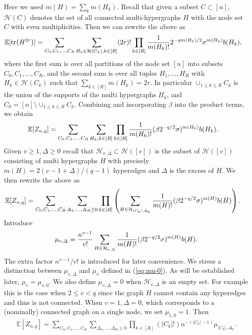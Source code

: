\documentclass[12pt]{article}
\newcommand{\E}{\mathbb{E}}
\newcommand{\cH}{\mathcal{H}}
\begin{document}
Here we used $m(H)=\sum_k m(H_k)$.
Recall that  given a subset $C\subset [n]$,  $\cH(C)$ denotes  the set of all connected multi-hypergraphs $H$ with the node set $C$
with even multiplicities. Then we can rewrite the above as
\begin{align*}
\E[\tr(H^{2r})]&=\sum_{C_0,C_1,\ldots,C_R} \sum_{H_k\in\cH(C_k),k\in [R]}(2r)!\prod_{k\in [R]}{1\over  m(H_k)!}2^{-q m(H_k)/2}\sigma^{m(H_k)} b(H_k),
\end{align*}
where the first sum is over all partitions of the node set $[n]$ into subsets $C_0,C_1,\ldots,C_R$, and the second sum is over all 
tuples $H_1,\ldots,H_R$ with $H_k\in\cH(C_k)$ such that $\sum_{k\in [R]} m(H_k) =2r$.  In particular $\cup_{1\le k\le R}C_k$
is the union of the supports of the multi hypergraphs $H_k$, and $C_0=[n]\setminus \cup_{1\le k\le R} C_k$.
Combining and incorporating $\beta$ into the product terms, 
we obtain
\begin{align*}
\E[Z_{n,q}]  &= 
 \sum_{C_0,C_1,\ldots,C_R} \sum_{H_k,k\in [R]}\prod_{k\in [R]}{1\over  m(H_k)!}(\beta2^{-q/2}\sigma)^{m(H_k)}b(H_k).
 \end{align*}
Given  $v\ge 1,\Delta\ge 0$ recall that $\cH_{v,\Delta}\subset \cH([v])$ is the subset of $\cH([v])$ consisting of multi hypergraphs $H$ with precisely 
$m(H)=2(v-1+\Delta)/(q-1)$ hyperedges and $\Delta$ is the excess of $H$.
We then rewrite the above as
\begin{align*}
\E[Z_{n,q}]  &= 
 \sum_{C_0,C_1,\ldots,C_R} \sum_{\Delta_1,\ldots,\Delta_R\ge 0}
 \prod_{k\in [R]}\left(\sum_{H\in \cH_{|C_k|,\Delta_k}}{1\over  m(H)  !}(\beta2^{-q/2}\sigma)^{m(H)}b(H)\right).
 \end{align*}
Introduce  
\begin{align}\label{eq:mu}
    \mu_{v,\Delta} = {n^{v-1}\over v!}\sum_{H\in \cH_{v,\Delta}}{1\over  m(H)!}(\beta 2^{-q/2}\sigma)^{m(H)}b(H).
\end{align}
The extra factor $n^{v-1}/v!$ is introduced for later convenience. 
We stress a distinction between $\mu_{v,\Delta}$ and $\mu_v$ defined in (\ref{eq:mu-0}).
As will be established later, $\mu_v=\mu_{v,0}$. 
We also define $\mu_{v,\Delta}=0$ when $\cH_{v,\Delta}$ is an empty set. For example
this is the case 
when  $2\le v<q$ since
the graph $H$ cannot contain any hyperedges and thus is not connected.
When $v=1,\Delta=0$,
which corresponds to a (nominally) connected graph on a single node, we set
$\mu_{1,0}=1$. 
Then
\begin{align*}
\E[Z_{n,q}]  = 
\sum_{C_0,C_1,\ldots,C_R} \sum_{\Delta_1,\ldots,\Delta_R\ge 0}\prod_{k\in [R]}(|C_k|!) n^{-({|C_k|-1})}\mu_{|C_k|,\Delta_k}.
\end{align*}
\end{document}
